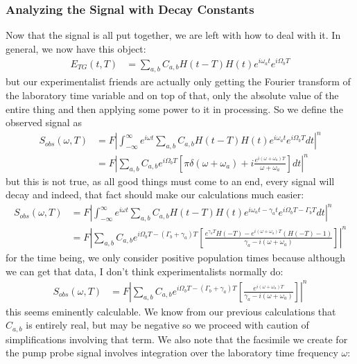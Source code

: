 \subsubsection{Analyzing the Signal with Decay Constants}
Now that the signal is all put together, we are left with how to deal with it.  In general, we now have this object:
\begin{align}
	E_{TG}(t, T) &= \sum_{a,b} C_{a,b}  H(t-T) H(t) e^{i \omega_a t} e^{i \Omega_b T}
\end{align}
but our experimentalist friends are actually only getting the Fourier transform of the laboratory time variable and on top of that, only the absolute value of the entire thing and then applying some power to it in processing.  So we define the observed signal as
\begin{align}
	S_{obs}(\omega, T) &= F \left| \int_{-\infty}^{\infty} e^{i \omega t} \sum_{a,b} C_{a,b}  H(t-T) H(t) e^{i \omega_a t} e^{i \Omega_b T}  d t \right|^n \\
	&=F \left| \sum_{a,b} C_{a,b}  e^{i \Omega_b T}  \left[ \pi \delta \left( \omega + \omega_a \right) + i\frac{e^{i (\omega + \omega_a) T}}{\omega + \omega_a} \right] d t \right|^n
\end{align}
but this is not true, as all good things must come to an end, every signal will decay and indeed, that fact should make our calculations much easier:
\begin{align}
	S_{obs}(\omega, T) &= F \left| \int_{-\infty}^{\infty} e^{i \omega t} \sum_{a,b} C_{a,b}  H(t-T) H(t) e^{i \omega_a t - \gamma_a t} e^{i \Omega_b T - \Gamma_b T}  d t \right|^n \\
	&= F \left| \sum_{a,b} C_{a,b}  e^{i \Omega_b T - \left( \Gamma_b + \gamma_a \right)T}  \left[  \frac{e^{\gamma_a T }H(-T) - e^{i(\omega + \omega_a)T} (H(-T) - 1) }{\gamma_a - i \left(  \omega + \omega_a \right)}\right] \right|^n
\end{align}
for the time being, we only consider positive population times because although we can get that data, I don't think experimentalists normally do:
\begin{align}
	S_{obs}(\omega, T)&= F \left| \sum_{a,b} C_{a,b}  e^{i \Omega_b T - \left( \Gamma_b + \gamma_a \right)T}  \left[  \frac{e^{i(\omega + \omega_a)T}  }{\gamma_a - i \left(  \omega + \omega_a \right)}\right] \right|^n
\end{align}
this seems eminently calculable.  We know from our previous calculations that $C_{a,b}$ is entirely real, but may be negative so we proceed with caution of simplifications involving that term.  We also note that the facsimile we create for the pump probe signal involves integration over the laboratory time frequency $\omega$:
